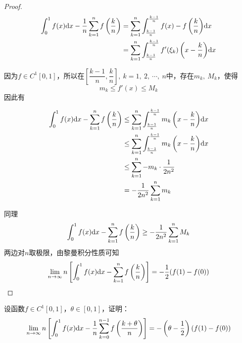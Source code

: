 \begin{proof}
    
    \begin{align*}
        \int_{0}^{1}{f(x)}\mathrm{d} x - \dfrac{1}{n}\sum\limits_{k = 1}^{n}{f\left(\dfrac{k}{n}\right)} & = \sum\limits_{k = 1}^{n}{\int_{\frac{k - 1}{n}}^{\frac{k - 1}{n}}{f(x) - f\left(\dfrac{k}{n}\right)}\mathrm{d} x} \\
        & = \sum\limits_{k = 1}^{n}{\int_{\frac{k - 1}{n}}^{\frac{k - 1}{n}}{f'(\xi_k)\left(x - \dfrac{k}{n}\right)}\mathrm{d} x} \\
    \end{align*}
    
    因为$f \in C^{1}[0,1]$，所以在$\left[\dfrac{k - 1}{n}, \dfrac{k}{n}\right],\ k = 1,\ 2,\  \cdots,\ n$中，存在$m_k,\ M_k$，使得
    $$m_k \leq f'(x) \leq M_k$$
    因此有

    \begin{align*}
        \int_{0}^{1}{f(x)}\mathrm{d} x - \sum\limits_{k = 1}^{n}{f\left(\dfrac{k}{n}\right)} & \leq \sum\limits_{k = 1}^{n}{\int_{\frac{k - 1}{n}}^{\frac{k - 1}{n}}{m_k\left(x - \dfrac{k}{n}\right)}\mathrm{d} x} \\
        & \leq \sum\limits_{k = 1}^{n}{\int_{\frac{k - 1}{n}}^{\frac{k - 1}{n}}{m_k\left(x - \dfrac{k}{n}\right)}\mathrm{d} x} \\
        & \leq \sum\limits_{k = 1}^{n}{-m_k \cdot \dfrac{1}{2n^2}} \\
        & = - \dfrac{1}{2n^2} \sum\limits_{k = 1}^{n}{m_k}
    \end{align*}

    同理
    $$\int_{0}^{1}{f(x)}\mathrm{d} x - \sum\limits_{k = 1}^{n}{f\left(\dfrac{k}{n}\right)} \geq - \dfrac{1}{2n^2} \sum\limits_{k = 1}^{n}{M_k}$$
    两边对$n$取极限，由黎曼积分性质可知
    $$\lim\limits_{n\to\infty}{n \left[\int_{0}^{1}{f(x)}\mathrm{d} x - \sum\limits_{k = 1}^{n}{f\left(\dfrac{k}{n}\right)}\right]} = -\dfrac{1}{2}(f(1) - f(0))$$
    
\end{proof}

\begin{proposition}
    
    设函数$f \in C^{1}[0,1]$，$\theta \in [0, 1]$，证明：
    $$\lim\limits_{n\to\infty}{n \left[\int_{0}^{1}{f(x)}\mathrm{d} x - \dfrac{1}{n}\sum\limits_{k = 0}^{n - 1}{f\left(\dfrac{k + \theta}{n}\right)}\right]} = -\left(\theta -\dfrac{1}{2}\right) (f(1) - f(0))$$
\end{proposition}

